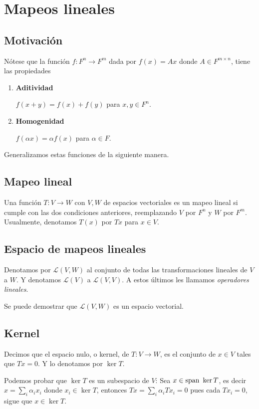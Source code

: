 \documentclass{article}
\begin{document}
\section{Mapeos lineales}
\subsection{Motivación}
Nótese que la función $f: F^n \rightarrow F^m$ dada por
$f(x) = Ax$ donde $A\in F^{m\times n}$, tiene las propiedades
\begin{enumerate}
    \item \textbf{Aditividad}

    $f(x+y) = f(x) + f(y)$ para $x,y\in F^n$.

    \item \textbf{Homogenidad}

    $f(\alpha x) = \alpha f(x)$ para $\alpha\in F$.
\end{enumerate}
Generalizamos estas funciones de la siguiente manera.

\subsection{Mapeo lineal}
Una función $T: V\rightarrow W$ con $V,W$ de espacios vectoriales es
un mapeo lineal si cumple con las dos condiciones anteriores, reemplazando $V$ por $F^n$ y $W$ por $F^m$. Usualmente,
denotamos $T(x)$ por $Tx$ para $x\in V$.

\subsection{Espacio de mapeos lineales}
Denotamos por $\mathcal{L}(V,W)$ al conjunto de todas
las transformaciones lineales de $V$ a $W$.
Y denotamos $\mathcal{L}(V)$ a $\mathcal{L}(V, V)$. A estos últimos
les llamamos \textit{operadores lineales}.

Se puede demostrar que $\mathcal{L}(V,W)$ es un espacio vectorial.

\subsection{Kernel}
Decimos que el espacio nulo, o kernel, de $T: V \rightarrow W$, es el conjunto de $x\in V$ tales que $Tx=0$. Y lo denotamos por
$\ker T$.

Podemos probar que $\ker T$ es un subespacio de $V$:
Sea $x \in \text{span } \ker T$, es decir $x = \sum_i \alpha_i x_i$ donde
$x_i\in \ker T$, entonces $Tx = \sum_i \alpha_i Tx_i = 0$ pues
cada $Tx_i=0$, sigue que $x\in\ker T$.
\end{document}
